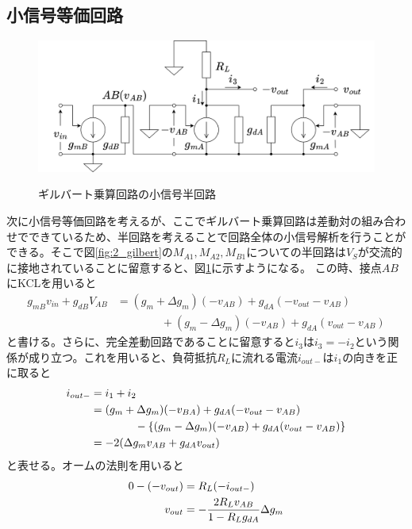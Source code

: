         \subsection{小信号等価回路}
            \begin{figure}[b]
                \begin{center}
                    \includegraphics[width=160mm]{figures/chapter2/halfeq.png}
                    \label{fig:2_halfeq}
                    \caption{ギルバート乗算回路の小信号半回路}
                \end{center}
            \end{figure}
            次に小信号等価回路を考えるが、ここでギルバート乗算回路は差動対の組み合わせでできているため、半回路を考えることで回路全体の小信号解析を行うことができる。そこで図\ref{fig:2_gilbert}の$M_{A1},M_{A2},M_{B1}$についての半回路は$V_{S}$が交流的に接地されていることに留意すると、図\ref{fig:2_halfeq}に示すようになる。
            この時、接点$AB$にKCLを用いると
            \begin{align}
                g_{mB}v_{in}+g_{dB}V_{AB}&=(g_{m}+\Delta g_{m})(-v_{AB})+g_{dA}(-v_{out}-v_{AB})\\
                &\quad\quad\quad\quad +(g_{m}-\Delta g_{m})(-v_{AB})+g_{dA}(v_{out}-v_{AB})     \label{eq:2_kcl}
            \end{align}
            と書ける。さらに、完全差動回路であることに留意すると$i_{3}$は$i_{3}=-i_{2}$という関係が成り立つ。これを用いると、負荷抵抗$R_{L}$に流れる電流$i_{out-}$は$i_{1}$の向きを正に取ると
            \begin{align}
                i_{out-}&=i_{1}+i_{2}       \notag\\
                &=(g_{m}+\Delta g_{m})(-v_{BA})+g_{dA}(-v_{out}-v_{AB})       \notag\\
                &\quad\quad\quad\quad -\left\{  (g_{m}-\Delta g_{m})(-v_{AB})+g_{dA}(v_{out}-v_{AB})  \right\}   \notag\\
                &=-2(\Delta g_{m}v_{AB}+g_{dA}v_{out})      \label{eq:2_iout}
            \end{align}
            と表せる。オームの法則を用いると
            \begin{align}
                0-(-v_{out})&=R_{L}(-i_{out-})      \notag\\
                v_{out}&=-\frac{ 2R_{L}v_{AB} }{ 1-R_{L}g_{dA} }  \Delta g_{m}  \label{eq:2_vout}
            \end{align}
            



